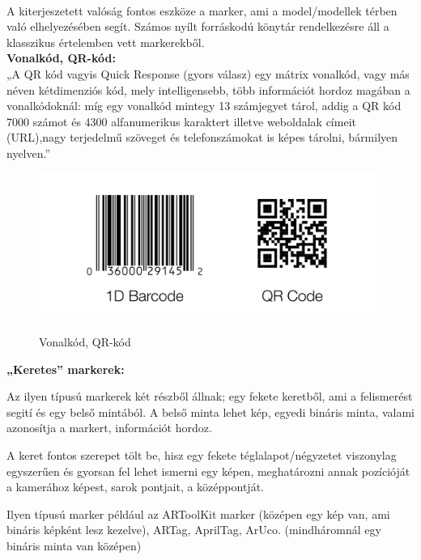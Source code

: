 

\\
A kiterjeszetett valóság fontos eszköze a marker, ami a model/modellek térben való elhelyezésében segít. Számos nyílt forráskodú könytár rendelkezésre áll a klasszikus értelemben vett markerekből.\\

{\bf Vonalkód, QR-kód:}\\
„A  QR  kód vagyis Quick  Response  (gyors  válasz) egy  mátrix  vonalkód,  vagy  más  néven kétdimenziós kód, mely intelligensebb, több információt hordoz magában a vonalkódoknál: míg egy vonalkód mintegy 13 számjegyet tárol, addig a QR kód 7000 számot és 4300 alfanumerikus karaktert illetve weboldalak címeit (URL),nagy terjedelmű szöveget és telefonszámokat is képes tárolni, bármilyen nyelven.”\cite{QR}\\

\begin{figure}[htp]
    \centering
   	\includegraphics[width=4.8truecm, height=2truecm]{images/qr_bar.png}
	\caption{Vonalkód, QR-kód}
	\cite{qrkep}
\end{figure}

{\bf „Keretes” markerek:}

Az ilyen típusú markerek két részből állnak; egy fekete keretből, ami a felismerést segití és egy belső mintából. A belső minta lehet kép, egyedi bináris minta, valami azonosítja a markert, információt hordoz.

A keret fontos szerepet tölt be, hisz egy fekete téglalapot/négyzetet viszonylag egyszerűen és gyorsan fel lehet ismerni egy képen, meghatározni annak pozícióját a kamerához képest, sarok pontjait, a középpontját.

Ilyen típusú marker például az ARToolKit marker (középen egy kép van, ami bináris képként lesz kezelve), ARTag, AprilTag, ArUco. (mindháromnál egy bináris minta van középen)

